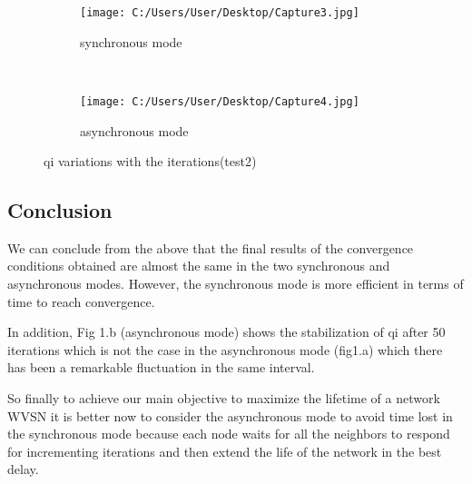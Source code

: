 \documentclass[12pt,a4]{article}
\begin{document}
\vspace{0.8cm}

\begin{figure}[ht]
\centering
	\begin{center}
	     \begin{subfigure}[normla]{0.4\textwidth}
		\texttt{[image: C:/Users/User/Desktop/Capture3.jpg]}
		\caption{synchronous mode}
	    \end{subfigure}
\hspace{0.8cm}
	~
	    \begin{subfigure}[normla]{0.4\textwidth}
		\texttt{[image: C:/Users/User/Desktop/Capture4.jpg]}
		\caption{asynchronous mode}
	    \end{subfigure}
	\end{center}
\caption{qi variations with the iterations(test2) }
\end{figure}

\subsection{Conclusion}

\hspace{0.6cm}We can conclude from the above that the final results of the convergence conditions obtained are almost the same in the two synchronous and asynchronous modes. However, the synchronous mode is more efficient in terms of time to reach convergence.

In addition, Fig 1.b (asynchronous mode) shows the stabilization of qi after 50 iterations which is not the case in the asynchronous mode (fig1.a) which there has been a remarkable fluctuation in the same interval. 

So finally to achieve our main objective to maximize the lifetime of a network WVSN it is better now to consider the asynchronous mode to avoid time lost in the synchronous mode because each node waits for all the neighbors to respond for incrementing iterations and then extend the life of the network in the best delay.
\end{document}
